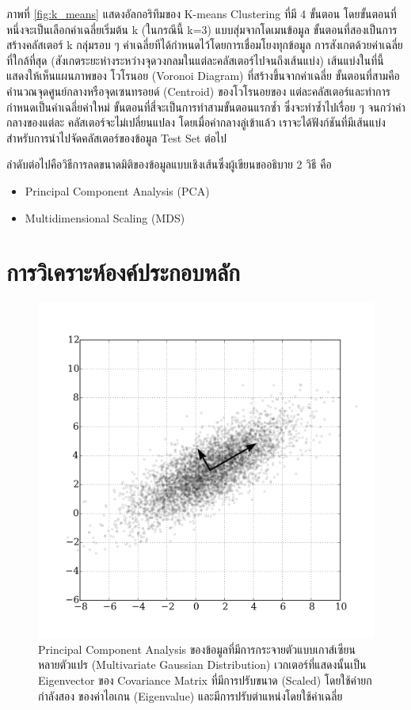 ภาพที่ \ref{fig:k_means} แสดงอัลกอริทึมของ K-means Clustering ที่มี 4 ขั้นตอน โดยขั้นตอนที่หนึ่งจะเป็นเลือกค่าเฉลี่ยเริ่มต้น k 
(ในกรณีนี้ k=3) แบบสุ่มจากโดเมนข้อมูล ขั้นตอนที่สองเป็นการสร้างคลัสเตอร์ k กลุ่มรอบ ๆ ค่าเฉลี่ยทีได้กำหนดไว้โดยการเชื่อมโยงทุกข้อมูล%
การสังเกตด้วยค่าเฉลี่ยที่ใกล้ที่สุด (สังเกตระยะห่างระหว่างจุดวงกลมในแต่ละคลัสเตอร์ไปจนถึงเส้นแบ่ง) เส้นแบ่งในที่นี้แสดงให้เห็นแผนภาพของ%
โวโรนอย (Voronoi Diagram) ที่สร้างขึ้นจากค่าเฉลี่ย ขั้นตอนที่สามคือคำนวณจุดศูนย์กลางหรือจุดเซนทรอยด์ (Centroid) ของโวโรนอยของ%
แต่ละคลัสเตอร์และทำการกำหนดเป็นค่าเฉลี่ยค่าใหม่ ขั้นตอนที่สี่จะเป็นการทำสามขั้นตอนแรกซ้ำ ซึ่งจะทำซ้ำไปเรื่อย ๆ จนกว่าค่ากลางของแต่ละ%
คลัสเตอร์จะไม่เปลี่ยนแปลง โดยเมื่อค่ากลางลู่เข้าแล้ว เราจะได้ฟังก์ชันที่มีเส้นแบ่งสำหรับการนำไปจัดคลัสเตอร์ของข้อมูล Test Set ต่อไป

ลำดับต่อไปคือวิธีการลดขนาดมิติของข้อมูลแบบเชิงเส้นซึ่งผู้เขียนขออธิบาย 2 วิธี คือ

\begin{itemize}[topsep=0pt]
    \item Principal Component Analysis (PCA)
    
    \item Multidimensional Scaling (MDS)
\end{itemize}

\section{การวิเคราะห์องค์ประกอบหลัก}
\label{sec:pca}

\begin{figure}[htbp]
    \centering
    \includegraphics[width=0.8\linewidth]{fig/pca.png}
    \caption{Principal Component Analysis ของข้อมูลที่มีการกระจายตัวแบบเกาส์เซียนหลายตัวแปร (Multivariate Gaussian
    Distribution) เวกเตอร์ที่แสดงนั้นเป็น Eigenvector ของ Covariance Matrix ที่มีการปรับขนาด (Scaled) โดยใช้ค่ายกกำลังสอง%
    ของค่าไอเกน (Eigenvalue) และมีการปรับตำแหน่งโดยใช้ค่าเฉลี่ย}
    \label{fig:pca}
\end{figure}

